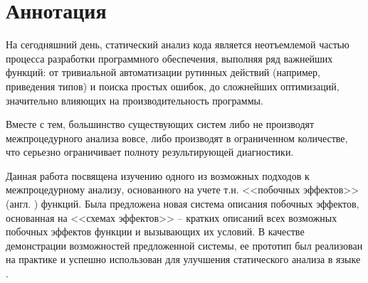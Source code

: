 \section*{Аннотация}

На сегодняшний день, статический анализ кода является неотъемлемой частью процесса разработки программного обеспечения, выполняя ряд важнейших функций: от тривиальной автоматизации рутинных действий (например, приведения типов) и поиска простых ошибок, до сложнейших оптимизаций, значительно влияющих на производительность программы. 

Вместе с тем, большинство существующих систем либо не производят межпроцедурного анализа вовсе, либо производят в ограниченном количестве, что серьезно ограничивает полноту результирующей диагностики.

Данная работа посвящена изучению одного из возможных подходов к межпроцедурному анализу, основанного на учете т.н. <<побочных эффектов>> (англ. ) функций. Была предложена новая система описания побочных эффектов, основанная на <<схемах эффектов>> -- кратких описаний всех возможных побочных эффектов функции и вызывающих их условий. В качестве демонстрации возможностей предложенной системы, ее прототип был реализован на практике и успешно использован для улучшения статического анализа в языке .